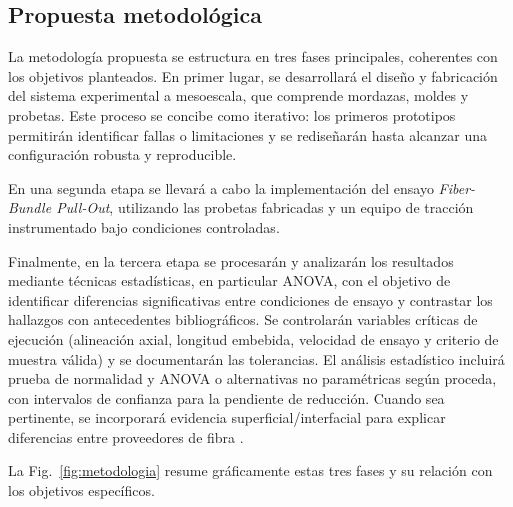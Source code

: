 \subsection{Propuesta metodológica}

La metodología propuesta se estructura en tres fases principales, coherentes con los objetivos
planteados. En primer lugar, se desarrollará el diseño y fabricación del sistema experimental
a mesoescala, que comprende mordazas, moldes y probetas. Este proceso se concibe como iterativo:
los primeros prototipos permitirán identificar fallas o limitaciones y se rediseñarán
hasta alcanzar una configuración robusta y reproducible.

En una segunda etapa se llevará a cabo la implementación del ensayo \textit{Fiber-Bundle Pull-Out},
utilizando las probetas fabricadas y un equipo de tracción instrumentado bajo condiciones
controladas.

Finalmente, en la tercera etapa se procesarán y analizarán los resultados mediante técnicas
estadísticas, en particular ANOVA, con el objetivo de identificar diferencias significativas
entre condiciones de ensayo y contrastar los hallazgos con antecedentes bibliográficos.
Se controlarán variables críticas de ejecución (alineación axial, longitud embebida, velocidad de
ensayo y criterio de muestra válida) y se documentarán las tolerancias. El análisis estadístico
incluirá prueba de normalidad y ANOVA o alternativas no paramétricas según proceda, con intervalos
de confianza para la pendiente de reducción. Cuando sea pertinente, se incorporará evidencia
superficial/interfacial para explicar diferencias entre proveedores de fibra \cite{AhmadvashAghbash2024IMR,Liu2021}.

La Fig.~\ref{fig:metodologia} resume gráficamente estas tres fases y su relación con los objetivos específicos.

